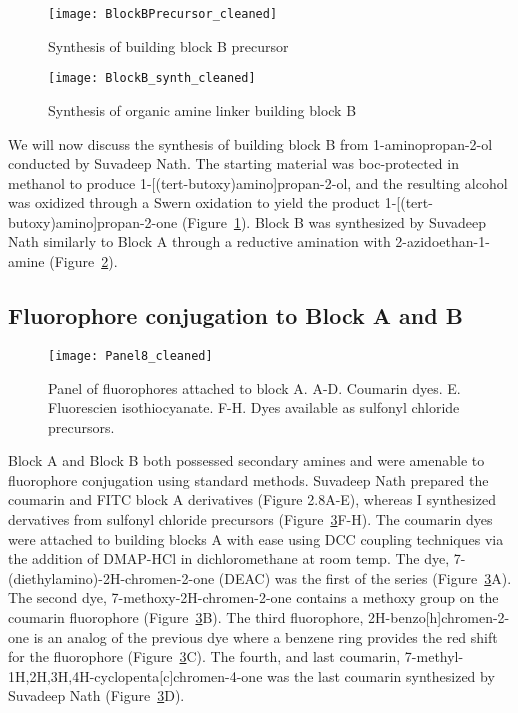 \begin{figure}
\texttt{[image: BlockBPrecursor\_cleaned]}
\caption{Synthesis of building block B precursor}
\label{fig:BlockBPrecursor}
\end{figure}

\clearpage

\begin{figure}
\texttt{[image: BlockB\_synth\_cleaned]}
\caption{Synthesis of organic amine linker building block B}
\label{fig:BocBlockB}
\end{figure}

We will now discuss the synthesis of building block B from 1-aminopropan-2-ol conducted by Suvadeep Nath. The starting material was boc-protected in methanol to produce 1-[(tert-butoxy)amino]propan-2-ol, and the resulting alcohol was oxidized through a Swern oxidation to yield the product 1-[(tert-butoxy)amino]propan-2-one (Figure~\ref{fig:BlockBPrecursor}). Block B was synthesized by Suvadeep Nath similarly to Block A through a reductive amination with 2-azidoethan-1-amine (Figure~\ref{fig:BocBlockB}).

\subsection{Fluorophore conjugation to Block A and B}

\begin{figure}
\texttt{[image: Panel8\_cleaned]}
\caption{Panel of fluorophores attached to block A. A-D. Coumarin dyes. E. Fluorescien isothiocyanate. F-H. Dyes available as sulfonyl chloride precursors.}
\label{fig:BlockADyes}
\end{figure}

Block A and Block B both possessed secondary amines and were amenable to fluorophore conjugation using standard methods. Suvadeep Nath prepared the coumarin and FITC block A derivatives (Figure 2.8A-E), whereas I synthesized dervatives from sulfonyl chloride precursors (Figure~\ref{fig:BlockADyes}F-H). The coumarin dyes were attached to building blocks A with ease using DCC coupling techniques via the addition of DMAP-HCl in dichloromethane at room temp. The dye, 7-(diethylamino)-2H-chromen-2-one (DEAC) was the first of the series (Figure~\ref{fig:BlockADyes}A). The second dye, 7-methoxy-2H-chromen-2-one contains a methoxy group on the coumarin fluorophore (Figure~\ref{fig:BlockADyes}B). The third fluorophore, 2H-benzo[h]chromen-2-one is an analog of the previous dye where a benzene ring provides the red shift for the fluorophore (Figure~\ref{fig:BlockADyes}C). The fourth, and last coumarin, 7-methyl-1H,2H,3H,4H-cyclopenta[c]chromen-4-one was the last coumarin synthesized by Suvadeep Nath (Figure~\ref{fig:BlockADyes}D).

